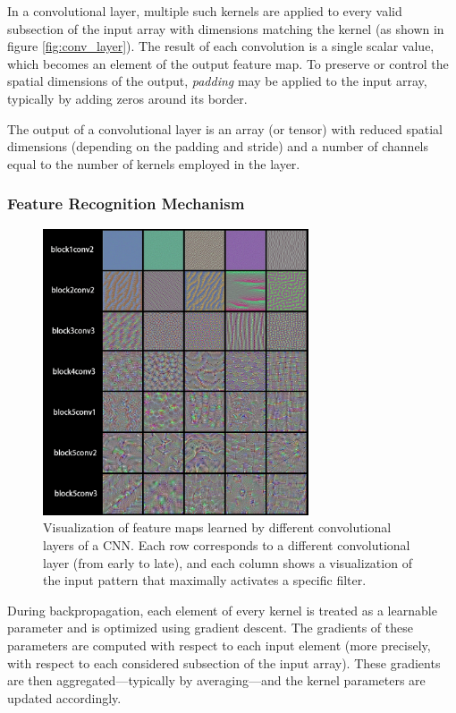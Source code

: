 \documentclass{pracalicmgr}
\begin{document}
In a convolutional layer, multiple such kernels are applied to every valid subsection of the input array with dimensions matching the kernel (as shown in figure \ref{fig:conv_layer}). The result of each convolution is a single scalar value, which becomes an element of the output feature map. To preserve or control the spatial dimensions of the output, \textit{padding} may be applied to the input array, typically by adding zeros around its border.

The output of a convolutional layer is an array (or tensor) with reduced spatial dimensions (depending on the padding and stride) and a number of channels equal to the number of kernels employed in the layer.

\subsubsection{Feature Recognition Mechanism}

\begin{figure}[h]
    \centering
    \includegraphics[width=0.7\textwidth]{src/convViz.png}
    \caption{Visualization of feature maps learned by different convolutional layers of a CNN. Each row corresponds to a different convolutional layer (from early to late), and each column shows a visualization of the input pattern that maximally activates a specific filter. \cite{exCNN}}
    \label{fig:convviz}
\end{figure}


During backpropagation, each element of every kernel is treated as a learnable parameter and is optimized using gradient descent. The gradients of these parameters are computed with respect to each input element (more precisely, with respect to each considered subsection of the input array). These gradients are then aggregated—typically by averaging—and the kernel parameters are updated accordingly.
\end{document}
